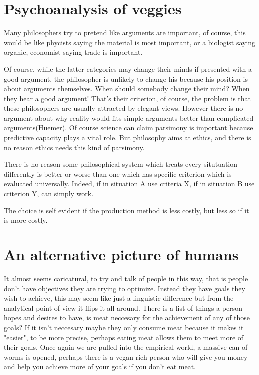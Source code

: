 \documentclass[12pt]{report}
\numberwithin{equation}{section}
\begin{document}
\section{Psychoanalysis of veggies}

Many philosophers try to pretend like arguments are important, of course, this would be like phycists saying the material is most important, or a biologist saying organic, economist saying trade is important. 

Of course, while the latter categories may change their minds if presented with a good argument, the philosopher is unlikely to change his because his position is about arguments themselves. When should somebody change their mind? When they hear a good argument! That's their criterion, of course, the problem is that these philosophers are usually attracted by elegant views. However there is no argument about why reality would fits simple arguments better than complicated arguments(Huemer). Of course science can claim parsimony is important because predictive capacity plays a vital role. But philosophy aims at ethics, and there is no reason ethics needs this kind of parsimony. 

There is no reason some philosophical system which treats every situtuation differently is better or worse than one which has specific criterion which is evaluated universally. Indeed, if in situation A use criteria X, if in situation B use criterion Y, can simply work. 


The choice is self evident if the production method is less costly, but less so if it is more costly. 


\section{An alternative picture of humans}

It almost seems caricatural, to try and talk of people in this way, that is people don't have objectives they are trying to optimize. Instead they have goals they wish to achieve, this may seem like just a linguistic difference but from the analytical point of view it flips it all around. There is a list of things a person hopes and desires to have, is meat neccesary for the achievement of any of those goals? If it isn't neccesary maybe they only consume meat because it makes it "easier", to be more precise, perhaps eating meat allows them to meet more of their goals. Once again we are pulled into the empirical world, a massive can of worms is opened, perhaps there is a vegan rich person who will give you money and help you achieve more of your goals if you don't eat meat. 
\end{document}
